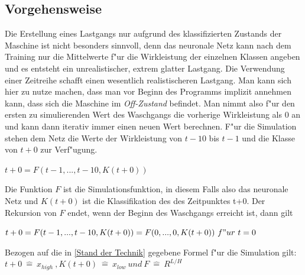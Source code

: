 \subsection{Vorgehensweise}
\label{Vorgehensweise}
Die Erstellung eines Lastgangs nur aufgrund des klassifizierten Zustands der Maschine ist nicht besonders sinnvoll, denn das neuronale Netz kann nach dem Training nur die Mittelwerte f"ur die Wirkleistung der einzelnen Klassen angeben und es entsteht ein unrealistischer, extrem glatter Lastgang. Die Verwendung einer Zeitreihe schafft einen wesentlich realistischeren Lastgang. Man kann sich hier zu nutze machen, dass man vor Beginn des Programms implizit annehmen kann, dass sich die Maschine im \textit{Off-Zustand} befindet. Man nimmt also f"ur den ersten zu simulierenden Wert des Waschgangs die vorherige Wirkleistung als 0 an und kann dann iterativ immer einen neuen Wert berechnen. F"ur die Simulation stehen dem Netz die Werte der Wirkleistung von $t-10$ bis $t-1$ und die Klasse von $t+0$ zur Verf"ugung.\\
\begin{center}
$t+0 = F(t-1,...,t-10,K(t+0))$
\end{center}
Die Funktion $F$ ist die Simulationsfunktion, in diesem Falls also das neuronale Netz und $K(t+0)$ ist die Klassifikation des des Zeitpunktes t+0. Der Rekursion von $F$ endet, wenn der Beginn des Waschgangs erreicht ist, dann gilt \\
\begin{center} 
$t+0 = F(t-1,...,t-10,K(t+0)) = F(0,...,0,K(t+0))\ f"ur\ t = 0$
\end{center} 
Bezogen auf die in \ref{Stand der Technik} gegebene Formel f"ur die Simulation gilt: $t+0\ \widehat{=}\ x_{high}\ , K(t+0)\ \widehat{=}\ x_{low}\ und\ F\ \widehat{=}\ R^{L/H}$